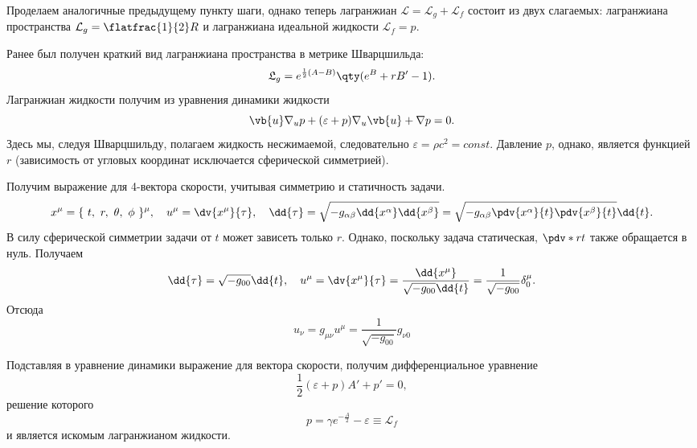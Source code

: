 \documentclass[\docroot/reports/draft/report.tex]{subfiles}
\begin{document}
    Проделаем аналогичные предыдущему пункту шаги, однако теперь лагранжиан $\mathcal{L} = \mathcal{L}_g + \mathcal{L}_f$ состоит из двух слагаемых: лагранжиана пространства $\mathcal{L}_g = \flatfrac{1}{2} R$ и лагранжиана идеальной жидкости $\mathcal{L}_f = p$.

    Ранее был получен краткий вид лагранжиана пространства в метрике Шварцшильда:
    \begin{equation*}
        \mathfrak{L}_g = e^{\frac{1}{2} (A - B)} \qty(e^B + r B' - 1) .
    \end{equation*}
    Лагранжиан жидкости получим из уравнения динамики жидкости
    \begin{equation*}
        \vb{u} \nabla_u p + (\varepsilon + p) \nabla_u \vb{u} + \nabla p = 0 .
    \end{equation*}
    Здесь мы, следуя Шварцшильду, полагаем жидкость несжимаемой, следовательно $\varepsilon = \rho c^2 = const$. Давление $p$, однако, является функцией $r$ (зависимость от угловых координат исключается сферической симметрией).

    Получим выражение для 4-вектора скорости, учитывая симметрию и статичность задачи.
    \begin{equation*}
        x^\mu = \{\ t,\ r,\ \theta,\ \phi \ \}^\mu , \quad
        u^\mu = \dv{x^\mu}{\tau} , \quad
        \dd{\tau} = \sqrt{ - g_{\alpha\beta} \dd{x^\alpha} \dd{x^\beta} }
                  = \sqrt{ - g_{\alpha\beta} \pdv{x^\alpha}{t} \pdv{x^\beta}{t} } \dd{t} .
    \end{equation*}
    В силу сферической симметрии задачи от $t$ может зависеть только $r$. Однако, поскольку задача статическая, $\pdv*{r}{t}$ также обращается в нуль. Получаем
    \begin{equation*}
        \dd{\tau} = \sqrt{ - g_{00} } \dd{t} , \quad
        u^\mu = \dv{x^\mu}{\tau}
              = \frac{\dd{x^\mu}}{\sqrt{- g_{00}} \dd{t}}
              = \frac{1}{\sqrt{- g_{00}}} \delta^\mu_0 .
    \end{equation*}
    Отсюда
    \begin{equation*}
        u_\nu = g_{\mu\nu} u^\mu = \frac{1}{\sqrt{- g_{00}}} g_{\nu 0}
    \end{equation*}

    Подставляя в уравнение динамики выражение для вектора скорости, получим дифференциальное уравнение
    \begin{equation*}
        \frac{1}{2} (\varepsilon + p) A' + p' = 0 ,
    \end{equation*}
    решение которого
    \begin{equation*}
        p = \gamma e^{-\frac{A}{2}} - \varepsilon \equiv \mathcal{L}_f
    \end{equation*}
    и является искомым лагранжианом жидкости.
\end{document}

